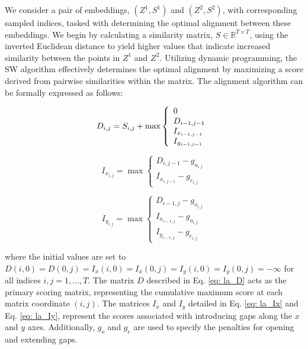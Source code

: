 We consider a pair of embeddings, $(Z^1, S^1)$ and $(Z^2, S^2)$, with corresponding sampled indices, tasked with determining the optimal alignment between these embeddings.
We begin by calculating a similarity matrix, $S \in \mathbb{R}^{T \times T}$, using the inverted Euclidean distance to yield higher values that indicate increased similarity between the points in $Z^1$ and $Z^2$. 
Utilizing dynamic programming, the SW algorithm effectively determines the optimal alignment by maximizing a score derived from pairwise similarities within the matrix. 
The alignment algorithm can be formally expressed as follows:


\begin{equation}
    D_{i,j} = S_{i, j} + \max \left\{
    \begin{array}{l}
        0 \\
        D_{i - 1,j - 1} \\
        I_{x_{i - 1,j - 1}} \\
        I_{y_{i - 1,j - 1}}
    \end{array} \label{eq: la_D}
\right. \\
\end{equation}

\begin{equation}
I_{x_{i,j}} = \max \left\{
    \begin{array}{l}
        D_{i, j - 1} - g_{o_{i, j}} \\
        I_{x_{i, j -1}} - g_{e_{i, j}}
    \end{array}
\right. \label{eq: la_Ix}
\end{equation}

\begin{equation}
I_{y_{i,j}} = \max \left\{
    \begin{array}{l}
        D_{i - 1, j} - g_{o_{i, j}}  \\
        I_{x_{i - 1, j}} - g_{o_{i, j}} \\
        I_{y_{i - 1, j}} - g_{e_{i, j}} 
    \end{array}
\right. \label{eq: la_Iy}
\end{equation}

where the initial values are set to $D(i, 0) = D(0, j) = I_x(i, 0) = I_x(0, j) = I_y(i, 0) = I_y(0, j) = -\infty$ for all indices $i, j = 1, \ldots, T$. The matrix $D$ described in Eq. \ref{eq: la_D} acts as the primary scoring matrix, representing the cumulative maximum score at each matrix coordinate $(i, j)$. The matrices $I_x$ and $I_y$ detailed in Eq. \ref{eq: la_Ix} and Eq. \ref{eq: la_Iy}, represent the scores associated with introducing gaps along the $x$ and $y$ axes. Additionally, $g_o$ and $g_e$ are used to specify the penalties for opening and extending gaps.

